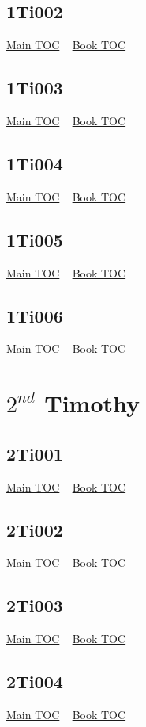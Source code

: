 \documentclass{book}
\begin{document}
  \section{1Ti002}\hyperlink{toc}{Main TOC} ~ \hyperref[subsec:1Ti]{Book TOC} 
  \section{1Ti003}\hyperlink{toc}{Main TOC} ~ \hyperref[subsec:1Ti]{Book TOC} 
  \section{1Ti004}\hyperlink{toc}{Main TOC} ~ \hyperref[subsec:1Ti]{Book TOC} 
  \section{1Ti005}\hyperlink{toc}{Main TOC} ~ \hyperref[subsec:1Ti]{Book TOC} 
  \section{1Ti006}\hyperlink{toc}{Main TOC} ~ \hyperref[subsec:1Ti]{Book TOC} 
  \chapter{$2^{nd}$ Timothy} \label{subsec:2Ti} \begin{multicols}{2} \minitoc \end{multicols}
  \section{2Ti001}\hyperlink{toc}{Main TOC} ~ \hyperref[subsec:2Ti]{Book TOC} 
  \section{2Ti002}\hyperlink{toc}{Main TOC} ~ \hyperref[subsec:2Ti]{Book TOC} 
  \section{2Ti003}\hyperlink{toc}{Main TOC} ~ \hyperref[subsec:2Ti]{Book TOC} 
  \section{2Ti004}\hyperlink{toc}{Main TOC} ~ \hyperref[subsec:2Ti]{Book TOC} 
\end{document}
